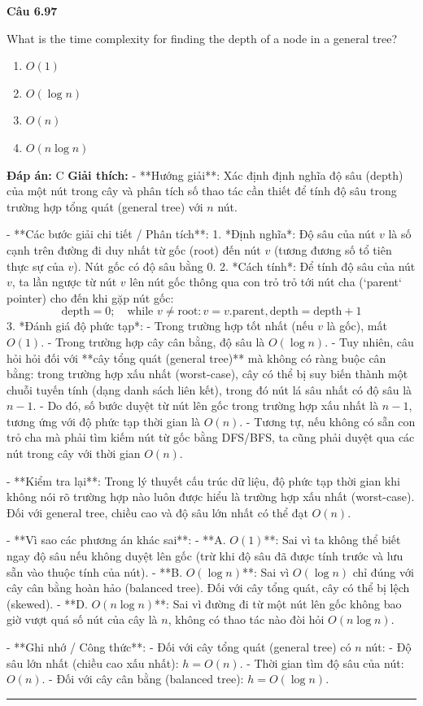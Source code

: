 \documentclass[11pt,a4paper]{article}
\newenvironment{question}[1]{%
  \par\vspace{1em}\noindent\textbf{\large Câu #1}\par\vspace{0.4em}
}{%
  \par\vspace{1em}\hrule\vspace{0.6em}
}
\newenvironment{choices}{%
  \begin{enumerate}[label=\textbf{\Alph*.},leftmargin=2.2em,itemsep=2pt,topsep=3pt]
}{%
  \end{enumerate}
}
\newcommand{\choice}{\item}
\begin{document}
\begin{question}{6.97}
What is the time complexity for finding the depth of a node in a general tree?
\begin{choices}
\choice \(O(1)\)
\choice \(O(\log n)\)
\choice \(O(n)\)
\choice \(O(n \log n)\)
\end{choices}
\textbf{Đáp án:} C
\textbf{Giải thích:} - **Hướng giải**:
  Xác định định nghĩa độ sâu (depth) của một nút trong cây và phân tích số thao tác cần thiết để tính độ sâu trong trường hợp tổng quát (general tree) với \(n\) nút.

- **Các bước giải chi tiết / Phân tích**:
  1. *Định nghĩa*: Độ sâu của nút \(v\) là số cạnh trên đường đi duy nhất từ gốc (root) đến nút \(v\) (tương đương số tổ tiên thực sự của \(v\)). Nút gốc có độ sâu bằng 0.
  2. *Cách tính*: Để tính độ sâu của nút \(v\), ta lần ngược từ nút \(v\) lên nút gốc thông qua con trỏ trỏ tới nút cha (`parent` pointer) cho đến khi gặp nút gốc:
     \[
     \text{depth} = 0; \quad \text{while } v \neq \text{root}: v = v.\text{parent}, \text{depth} = \text{depth} + 1
     \]
  3. *Đánh giá độ phức tạp*:
     - Trong trường hợp tốt nhất (nếu \(v\) là gốc), mất \(O(1)\).
     - Trong trường hợp cây cân bằng, độ sâu là \(O(\log n)\).
     - Tuy nhiên, câu hỏi hỏi đối với **cây tổng quát (general tree)** mà không có ràng buộc cân bằng: trong trường hợp xấu nhất (worst-case), cây có thể bị suy biến thành một chuỗi tuyến tính (dạng danh sách liên kết), trong đó nút lá sâu nhất có độ sâu là \(n - 1\).
     - Do đó, số bước duyệt từ nút lên gốc trong trường hợp xấu nhất là \(n - 1\), tương ứng với độ phức tạp thời gian là \(O(n)\).
     - Tương tự, nếu không có sẵn con trỏ cha mà phải tìm kiếm nút từ gốc bằng DFS/BFS, ta cũng phải duyệt qua các nút trong cây với thời gian \(O(n)\).

- **Kiểm tra lại**:
  Trong lý thuyết cấu trúc dữ liệu, độ phức tạp thời gian khi không nói rõ trường hợp nào luôn được hiểu là trường hợp xấu nhất (worst-case). Đối với general tree, chiều cao và độ sâu lớn nhất có thể đạt \(O(n)\).

- **Vì sao các phương án khác sai**:
  - **A. \(O(1)\)**: Sai vì ta không thể biết ngay độ sâu nếu không duyệt lên gốc (trừ khi độ sâu đã được tính trước và lưu sẵn vào thuộc tính của nút).
  - **B. \(O(\log n)\)**: Sai vì \(O(\log n)\) chỉ đúng với cây cân bằng hoàn hảo (balanced tree). Đối với cây tổng quát, cây có thể bị lệch (skewed).
  - **D. \(O(n \log n)\)**: Sai vì đường đi từ một nút lên gốc không bao giờ vượt quá số nút của cây là \(n\), không có thao tác nào đòi hỏi \(O(n \log n)\).

- **Ghi nhớ / Công thức**:
  - Đối với cây tổng quát (general tree) có \(n\) nút:
    - Độ sâu lớn nhất (chiều cao xấu nhất): \(h = O(n)\).
    - Thời gian tìm độ sâu của nút: \(O(n)\).
  - Đối với cây cân bằng (balanced tree): \(h = O(\log n)\).
\end{question}
\end{document}
